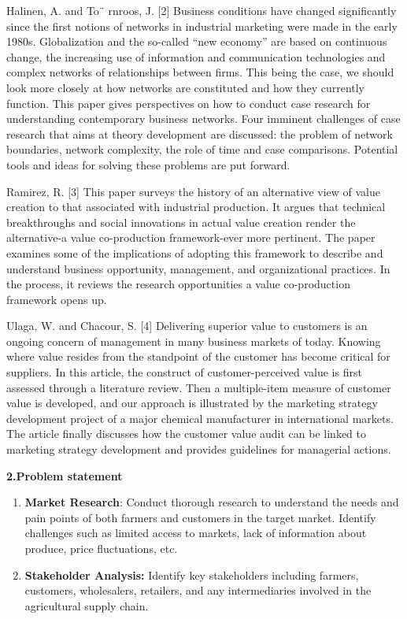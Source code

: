 \documentclass[
]{article}
\begin{document}
Halinen, A. and To¨ rnroos, J. {[}2{]} Business conditions have changed
significantly since the first notions of networks in industrial
marketing were made in the early 1980s. Globalization and the so-called
``new economy'' are based on continuous change, the increasing use of
information and communication technologies and complex networks of
relationships between firms. This being the case, we should look more
closely at how networks are constituted and how they currently function.
This paper gives perspectives on how to conduct case research for
understanding contemporary business networks. Four imminent challenges
of case research that aims at theory development are discussed: the
problem of network boundaries, network complexity, the role of time and
case comparisons. Potential tools and ideas for solving these problems
are put forward.

Ramirez, R. {[}3{]} This paper surveys the history of an alternative
view of value creation to that associated with industrial production. It
argues that technical breakthroughs and social innovations in actual
value creation render the alternative-a value co-production
framework-ever more pertinent. The paper examines some of the
implications of adopting this framework to describe and understand
business opportunity, management, and organizational practices. In the
process, it reviews the research opportunities a value co-production
framework opens up.

Ulaga, W. and Chacour, S. {[}4{]} Delivering superior value to customers
is an ongoing concern of management in many business markets of today.
Knowing where value resides from the standpoint of the customer has
become critical for suppliers. In this article, the construct of
customer-perceived value is first assessed through a literature review.
Then a multiple-item measure of customer value is developed, and our
approach is illustrated by the marketing strategy development project of
a major chemical manufacturer in international markets. The article
finally discusses how the customer value audit can be linked to
marketing strategy development and provides guidelines for managerial
actions.

\textbf{2.Problem statement}

\begin{enumerate}
\def\labelenumi{\arabic{enumi}.}
\item
  \textbf{Market Research}: Conduct thorough research to understand the
  needs and pain points of both farmers and customers in the target
  market. Identify challenges such as limited access to markets, lack of
  information about produce, price fluctuations, etc.
\item
  \textbf{Stakeholder Analysis:} Identify key stakeholders including
  farmers, customers, wholesalers, retailers, and any intermediaries
  involved in the agricultural supply chain.
\end{enumerate}
\end{document}
